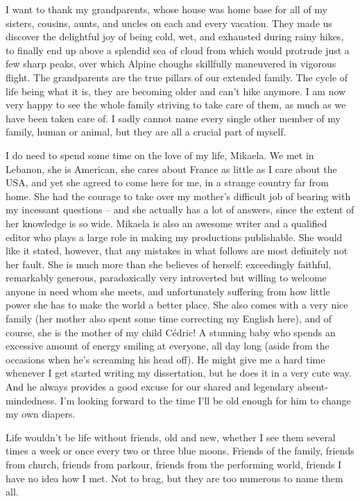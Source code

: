 I want to thank my grandparents, whose house was home base for all of my sisters, cousins, aunts, and uncles on each and every vacation. They made us discover the delightful joy of being cold, wet, and exhausted during rainy hikes, to finally end up above a splendid sea of cloud from which would protrude just a few sharp peaks, over which Alpine choughs skillfully maneuvered in vigorous flight. The grandparents are the true pillars of our extended family. The cycle of life being what it is, they are becoming older and can’t hike anymore. I am now very happy to see the whole family striving to take care of them, as much as we have been taken care of. I sadly cannot name every single other member of my family, human or animal, but they are all a crucial part of myself.

I do need to spend some time on the love of my life, Mikaela. We met in Lebanon, she is American, she cares about France as little as I care about the USA, and yet she agreed to come here for me, in a strange country far from home. She had the courage to take over my mother’s difficult job of bearing with my incessant questions – and she actually has a lot of answers, since the extent of her knowledge is so wide. Mikaela is also an awesome writer and a qualified editor who plays a large role in making my productions publishable. She would like it stated, however, that any mistakes in what follows are most definitely not her fault. She is much more than she believes of herself: exceedingly faithful, remarkably generous, paradoxically very introverted but willing to welcome anyone in need whom she meets, and unfortunately suffering from how little power she has to make the world a better place. She also comes with a very nice family (her mother also spent some time correcting my English here), and of course, she is the mother of my child Cédric! A stunning baby who spends an excessive amount of energy smiling at everyone, all day long (aside from the occasions when he’s screaming his head off). He might give me a hard time whenever I get started writing my dissertation, but he does it in a very cute way. And he always provides a good excuse for our shared and legendary absent-mindedness. I’m looking forward to the time I’ll be old enough for him to change my own diapers.

Life wouldn’t be life without friends, old and new, whether I see them several times a week or once every two or three blue moons. Friends of the family, friends from church, friends from parkour, friends from the performing world, friends I have no idea how I met. Not to brag, but they are too numerous to name them all.

